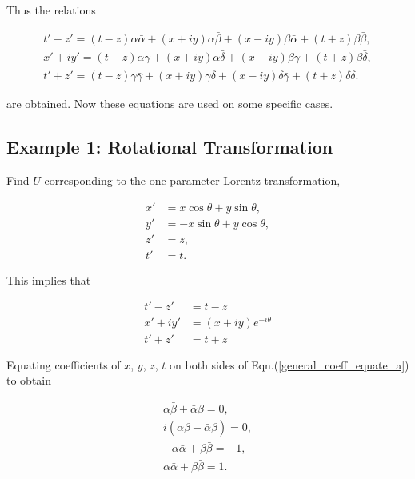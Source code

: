 \noindent Thus the relations

\begin{subequations}
\begin{gather}\label{general_coeff_equate_a}
t' - z'  = (t-z)\alpha\bar{\alpha} + (x + iy)\alpha\bar{\beta} + (x - iy)\beta\bar{\alpha} + (t+z)\beta\bar{\beta},
\\\label{general_coeff_equate_b}
x' + iy'  = (t-z)\alpha\bar{\gamma} + (x + iy)\alpha\bar{\delta} + (x-iy)\beta\bar{\gamma} + (t+z)\beta\bar{\delta},
\\\label{general_coeff_equate_c}
t' + z'  = (t-z)\gamma\bar{\gamma} + (x + iy)\gamma\bar{\delta} + (x-iy)\delta\bar{\gamma} + (t+z)\delta\bar{\delta}.
\end{gather}
\end{subequations}

\noindent are obtained. Now these equations are used on some specific cases.

\subsection{Example 1: Rotational Transformation}

\noindent Find $U$ corresponding to the one parameter Lorentz transformation,

\begin{align*} 
x' & = x\cos{\theta} + y\sin{\theta}, \\
y' & = -x\sin{\theta} + y\cos{\theta}, \\
z' & = z, \\
t' & = t.
\end{align*} 

\noindent This implies that

\begin{align*}
t'-z' & = t-z \\
x'+iy' & = (x+iy) e^{-i \theta} \\
t'+z' & = t+z
\end{align*}

\noindent Equating coefficients of $x$, $y$, $z$, $t$ on both sides of Eqn.(\ref{general_coeff_equate_a}) to obtain

\begin{subequations}
\begin{gather}\label{Ex1_equate_coeffs_first_a}
\alpha \bar{\beta} + \bar{\alpha} \beta = 0, \\\label{Ex1_equate_coeffs_first_b}
i (\alpha \bar{\beta} - \bar{\alpha} \beta) = 0, \\\label{Ex1_equate_coeffs_first_c}
-\alpha \bar{\alpha} + \beta \bar{\beta} = -1, \\\label{Ex1_equate_coeffs_first_d}
\alpha \bar{\alpha} + \beta \bar{\beta} = 1. 
\end{gather}
\end{subequations}

